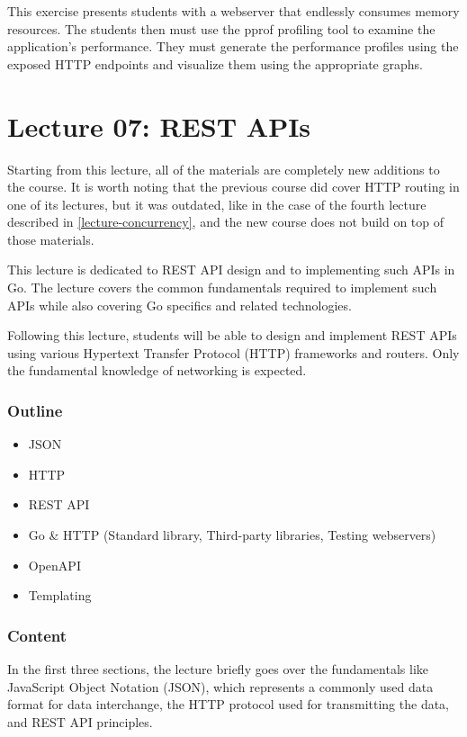 \documentclass[
  digital,
  color,
  oneside,
  nosansbold,
  nocolorbold,
  nolof,
  nolot,
]{fithesis4}
\begin{document}
This exercise presents students with a webserver that endlessly consumes memory resources. The students then must use the pprof profiling tool to examine the application's performance. They must generate the performance profiles using the exposed HTTP endpoints and visualize them using the appropriate graphs.

\section{Lecture 07: REST APIs}

Starting from this lecture, all of the materials are completely new additions to the course. It is worth noting that the previous course did cover HTTP routing in one of its lectures, but it was outdated, like in the case of the fourth lecture described in \cref{lecture-concurrency}, and the new course does not build on top of those materials.

This lecture is dedicated to REST API design and to implementing such APIs in Go. The lecture covers the common fundamentals required to implement such APIs while also covering Go specifics and related technologies. 

Following this lecture, students will be able to design and implement REST APIs using various Hypertext Transfer Protocol (HTTP) frameworks and routers. Only the fundamental knowledge of networking is expected.

\subsubsection{Outline}

\begin{itemize}
    \item JSON
    \item HTTP
    \item REST API
    \item Go \& HTTP (Standard library, Third-party libraries, Testing webservers)
    \item OpenAPI
    \item Templating
\end{itemize}

\subsubsection{Content}

In the first three sections, the lecture briefly goes over the fundamentals like JavaScript Object Notation (JSON), which represents a commonly used data format for data interchange, the HTTP protocol used for transmitting the data, and REST API principles.
\end{document}
